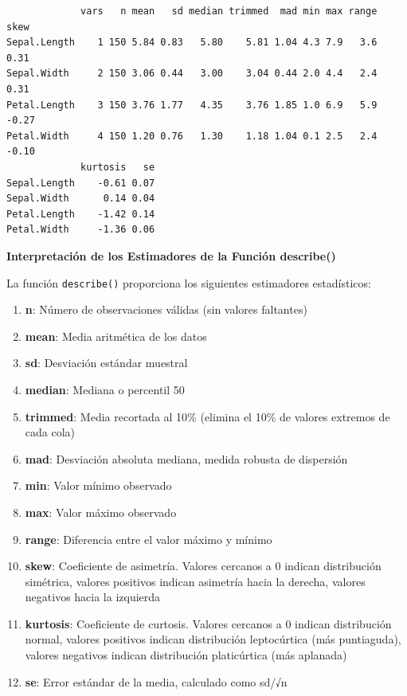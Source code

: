 \documentclass[
  spanish,
  letterpaper,
]{book}
\begin{document}
\begin{verbatim}
             vars   n mean   sd median trimmed  mad min max range  skew
Sepal.Length    1 150 5.84 0.83   5.80    5.81 1.04 4.3 7.9   3.6  0.31
Sepal.Width     2 150 3.06 0.44   3.00    3.04 0.44 2.0 4.4   2.4  0.31
Petal.Length    3 150 3.76 1.77   4.35    3.76 1.85 1.0 6.9   5.9 -0.27
Petal.Width     4 150 1.20 0.76   1.30    1.18 1.04 0.1 2.5   2.4 -0.10
             kurtosis   se
Sepal.Length    -0.61 0.07
Sepal.Width      0.14 0.04
Petal.Length    -1.42 0.14
Petal.Width     -1.36 0.06
\end{verbatim}

\textbf{Interpretación de los Estimadores de la Función describe()}

La función \texttt{describe()} proporciona los siguientes estimadores
estadísticos:

\begin{enumerate}
\def\labelenumi{\arabic{enumi}.}
\item
  \textbf{n}: Número de observaciones válidas (sin valores faltantes)
\item
  \textbf{mean}: Media aritmética de los datos
\item
  \textbf{sd}: Desviación estándar muestral
\item
  \textbf{median}: Mediana o percentil 50
\item
  \textbf{trimmed}: Media recortada al 10\% (elimina el 10\% de valores
  extremos de cada cola)
\item
  \textbf{mad}: Desviación absoluta mediana, medida robusta de
  dispersión
\item
  \textbf{min}: Valor mínimo observado
\item
  \textbf{max}: Valor máximo observado
\item
  \textbf{range}: Diferencia entre el valor máximo y mínimo
\item
  \textbf{skew}: Coeficiente de asimetría. Valores cercanos a 0 indican
  distribución simétrica, valores positivos indican asimetría hacia la
  derecha, valores negativos hacia la izquierda
\item
  \textbf{kurtosis}: Coeficiente de curtosis. Valores cercanos a 0
  indican distribución normal, valores positivos indican distribución
  leptocúrtica (más puntiaguda), valores negativos indican distribución
  platicúrtica (más aplanada)
\item
  \textbf{se}: Error estándar de la media, calculado como sd/√n
\end{enumerate}
\end{document}

